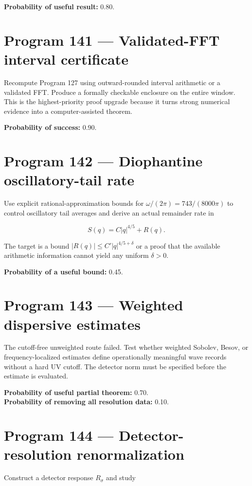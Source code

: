 \documentclass[11pt,a4paper,openany]{report}
\begin{document}
\textbf{Probability of useful result:} 0.80.

\section{Program 141 --- Validated-FFT interval certificate}

Recompute Program 127 using outward-rounded interval arithmetic or a validated FFT. Produce a formally checkable enclosure on the entire window. This is the highest-priority proof upgrade because it turns strong numerical evidence into a computer-assisted theorem.

\textbf{Probability of success:} 0.90.

\section{Program 142 --- Diophantine oscillatory-tail rate}

Use explicit rational-approximation bounds for \(\omega/(2\pi)=743/(8000\pi)\) to control oscillatory tail averages and derive an actual remainder rate in

\[
S(q)=C|q|^{4/5}+R(q).
\]

The target is a bound \(|R(q)|\le C'|q|^{4/5+\delta}\) or a proof that the available arithmetic information cannot yield any uniform \(\delta>0\).

\textbf{Probability of a useful bound:} 0.45.

\section{Program 143 --- Weighted dispersive estimates}

The cutoff-free unweighted route failed. Test whether weighted Sobolev, Besov, or frequency-localized estimates define operationally meaningful wave records without a hard UV cutoff. The detector norm must be specified before the estimate is evaluated.

\textbf{Probability of useful partial theorem:} 0.70.\\
\textbf{Probability of removing all resolution data:} 0.10.

\section{Program 144 --- Detector-resolution renormalization}

Construct a detector response \(R_\sigma\) and study
\end{document}
